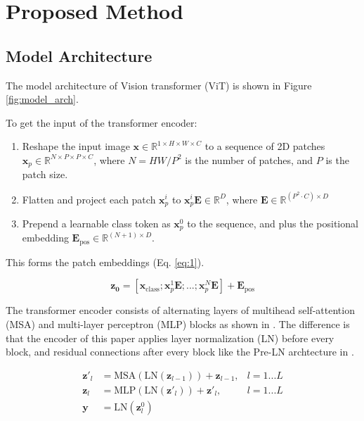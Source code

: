 \documentclass[12pt]{article}
\begin{document}

\section{Proposed Method}

\subsection{Model Architecture}

The model architecture of Vision transformer (ViT) is shown in Figure \ref{fig:model_arch}.

To get the input of the transformer encoder:

\begin{enumerate}
    \item Reshape the input image $\mathbf{x} \in \mathbb{R}^{1 \times H \times W \times C}$ to a sequence of 2D patches $\mathbf{x}_p \in \mathbb{R}^{N \times P \times P \times C}$, where $N = HW/P^2$ is the number of patches, and $P$ is the patch size.
    \item Flatten and project each patch $\mathbf{x}_p^i$ to $\mathbf{x}_p^i\mathbf{E} \in \mathbb{R}^D$, where $\mathbf{E} \in \mathbb{R}^{(P^2 \cdot C) \times D}$
    \item Prepend a learnable class token as $\mathbf{x}_p^0$ to the sequence, and plus the positional embedding $\mathbf{E}_\text{pos} \in \mathbb{R}^{(N+1) \times D}$.
\end{enumerate}

This forms the patch embeddings (Eq. \ref{eq:1}).

\begin{equation}
    \mathbf{z_0} = [\mathbf{x}_\text{class}; \mathbf{x}_p^1\mathbf{E}; ...; \mathbf{x}_p^N\mathbf{E}] + \mathbf{E}_\text{pos} \label{eq:1}
\end{equation}

The transformer encoder consists of alternating layers of multihead self-attention (MSA) and multi-layer perceptron (MLP) blocks as shown in \cite{vaswani_attention_2023}. The difference is that the encoder of this paper applies layer normalization (LN) before every block, and residual connections after every block like the Pre-LN archtecture in \cite{xiong_layer_2020}.

\begin{align}
    \mathbf{z'}_{l} &= \text{MSA}(\text{LN}(\mathbf{z}_{l-1})) + \mathbf{z}_{l-1}, & l = 1 ... L \\
    \mathbf{z}_{l} &= \text{MLP}(\text{LN}(\mathbf{z'}_{l})) + \mathbf{z'}_{l}, & l = 1 ... L \\
    \mathbf{y} &= \text{LN}(\mathbf{z}_{l}^0)
\end{align}
\end{document}

